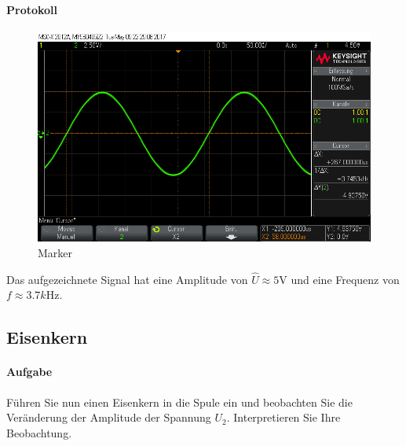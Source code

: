 \documentclass[10pt]{scrreprt}
\begin{document}
        \paragraph{Protokoll}
        \begin{center}
            \begin{figure}[H]
                \includegraphics[width=\textwidth]{scope_24.png}
                \caption{Marker}
            \end{figure}
        \end{center}

        Das aufgezeichnete Signal hat eine Amplitude von $\hat{U} \approx 5
        \si{\volt}$ und eine Frequenz von $f \approx 3.7 \si{k\hertz}$.

        \subsection{Eisenkern}
        \paragraph{Aufgabe}
        Führen Sie nun einen Eisenkern in die Spule ein und beobachten Sie die Veränderung
        der Amplitude der Spannung $U_2$. Interpretieren Sie Ihre Beobachtung.
\end{document}
